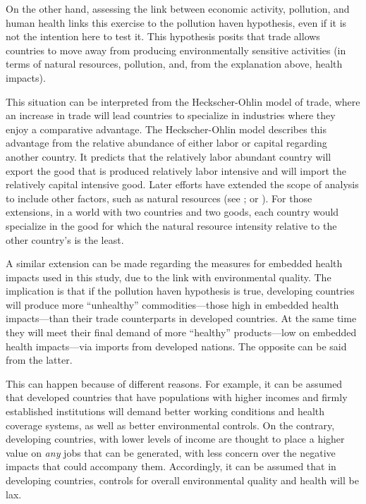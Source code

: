 \documentclass[a4paper,12pt]{article}
\begin{document}
On the other hand, assessing the link between economic activity, pollution, and human health links this exercise to the pollution haven hypothesis, even if it is not the intention here to test it. This hypothesis posits that trade allows countries to move away from producing environmentally sensitive activities (in terms of natural resources, pollution, and, from the explanation above, health impacts).

This situation can be interpreted from the Heckscher-Ohlin model of trade, where an increase in trade will lead countries to specialize in industries where they enjoy a comparative advantage. The Heckscher-Ohlin model describes this advantage from the relative abundance of either labor or capital regarding another country. It predicts that the relatively labor abundant country will export the good that is produced relatively labor intensive and will import the relatively capital intensive good. Later efforts have extended the scope of analysis to include other factors, such as natural resources (see \citealp{leamerleontief1980,leamersources1985}; or \citealp{bowenmulticountry1987}). For those extensions, in a world with two countries and two goods, each country would  specialize in the good for which  the natural resource intensity relative to the other country's is the least.

A similar extension can be made regarding the measures for embedded health impacts used in this study, due to the link with environmental quality. The implication is that if the pollution haven hypothesis is true, developing countries will produce more ``unhealthy'' commodities---those high in embedded health impacts---than their trade counterparts in developed countries. At the same time they will meet their final demand of more ``healthy'' products---low on embedded health impacts---via imports from developed nations. The opposite can be said from the latter.

This can happen because of different reasons. For example, it can be assumed that developed countries that have populations with higher incomes and firmly established institutions will demand better working conditions and health coverage systems, as well as better environmental controls. On the contrary, developing countries, with lower levels of income are thought to place a higher value on \textit{any} jobs that can be generated, with less concern over the negative impacts that could accompany them. Accordingly, it can be assumed that in developing countries, controls for overall environmental quality and health will be lax.
\end{document}
